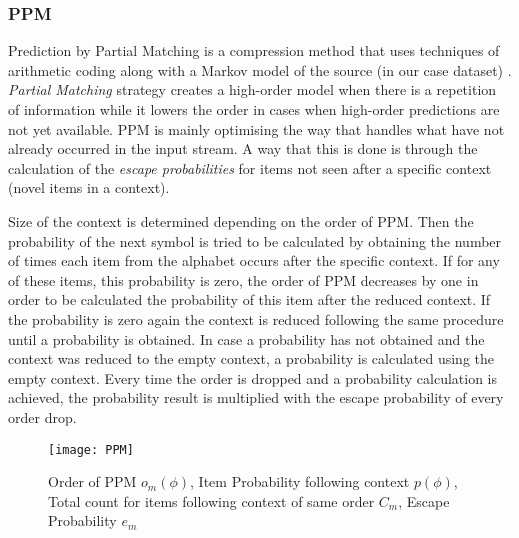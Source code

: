 \subsubsection{PPM}
Prediction by Partial Matching is a compression method that uses techniques of arithmetic coding along with a Markov model of the source (in our case dataset) \citep{cleary_witten_1984}. \emph{Partial Matching} strategy creates a high-order model when  there is a repetition of information while it lowers the order in cases when high-order predictions are not yet available. PPM is mainly optimising the way that handles what have not already occurred in the input stream. A way that this is done is through the calculation of the \emph{escape probabilities} for items not seen after a specific context (novel items in a context).
\par Size of the context is determined depending on the order of PPM. Then the probability of the next symbol is tried to be calculated by obtaining the number of times each item from the alphabet occurs after the specific context. If for any of these items, this probability is zero, the order of PPM decreases by one in order to be calculated the probability of this item after the reduced context. If the probability is zero again the context is reduced following the same procedure until a probability is obtained. In case a probability has not obtained and the context was reduced to the empty context, a probability is calculated using the empty context. Every time the order is dropped and a probability calculation is achieved, the probability result is multiplied with the escape probability of every order drop.

\begin{figure}[h]
    \centering
    \texttt{[image: PPM]}
    \caption{Order of PPM \(o_m(\phi)\), Item Probability following context \(p(\phi)\), Total count for items following context of same order \(C_m\), Escape Probability \(e_m\)}
    \label{fig:PPM}
\end{figure}
 
